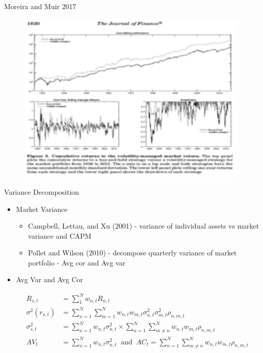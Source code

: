 \documentclass{beamer}
\begin{document}
\begin{frame}{Moreira and Muir 2017}
	\begin{figure}
			\includegraphics{mm}
	\end{figure}

\end{frame}

\begin{frame}{Variance Decomposition}
	\begin{itemize}[<+->]
	\item[]	%
	Market Variance
			\begin{itemize}[<+->]
				\item Campbell, Lettau, and Xu (2001) - variance of individual assets vs market variance and CAPM
				\item Pollet and Wilson (2010) - decompose quarterly variance of market portfolio - Avg cor and Avg var
			\end{itemize}
	\item[] Avg Var and Avg Cor

			\begin{align*}
			R_{s,t} &= \sum_{1}^{N}w_{n,t}R_{n,t} \\
			\sigma^{2}(r_{s,t}) &= \sum_{n=1}^{N} \sum_{m=1}^{N}w_{n,t}w_{m,t}\sigma^{2}_{n,t}\sigma^{2}_{m,t}\rho_{n,m,t}\\
			\sigma^{2}_{s,t} &= \sum_{n=1}^{N} w_{n,t}\sigma^{2}_{n,t} \times \sum_{n=1}^{N}\sum_{m \neq n}^{N}w_{n,t}w_{m,t}\rho_{n,m,t}\\
			AV_{t} &= \sum_{n=1}^{N} w_{n,t}\sigma^{2}_{n,t} ~ \text{ and } ~ AC_{t} = \sum_{n=1}^{N}\sum_{m \neq n}^{N}w_{n,t}w_{m,t}\rho_{n,m,t}
			\end{align*}
	\end{itemize}
	
\end{frame}
\end{document}
